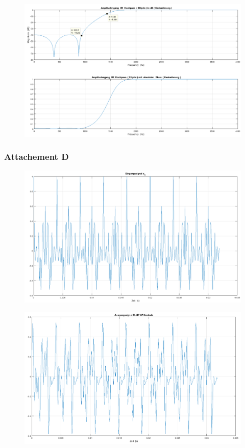 \begin{figure}[h]
\centering
\includegraphics[width=0.7\linewidth]{Bilder/Attachment_B_ELLIP_KASKADE}
\caption{}
\label{fig:Attachment_B_ELLIP_KASKADE}
\end{figure}

\clearpage

\subsubsection{Attachement D}

\begin{figure}[h]
\centering
\includegraphics[width=0.7\linewidth]{Bilder/Attachment_D_Eingangszeitsignal}
\caption{}
\label{fig:Attachment_D_Eingangszeitsignal}
\end{figure}

\begin{figure}[h]
\centering
\includegraphics[width=0.7\linewidth]{Bilder/Attachment_D_Ausgangssignal_ellip_lp}
\caption{}
\label{fig:Attachment_D_Ausgangssignal_ellip_lp}
\end{figure}

